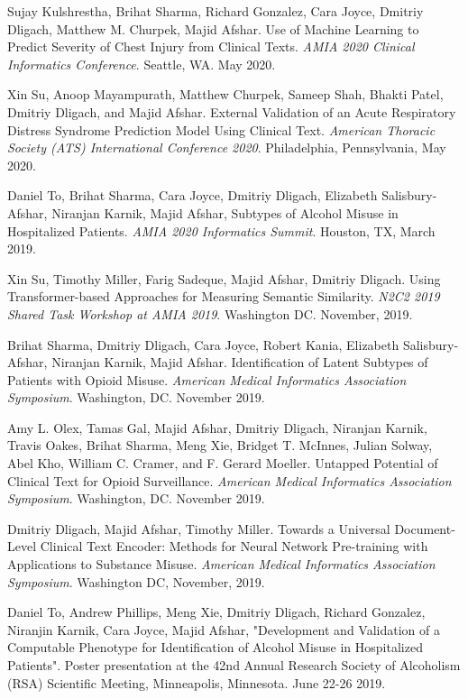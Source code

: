 \documentclass[letterpaper]{article}
\renewenvironment{itemize}{
  \begin{list}{}{
    \setlength{\leftmargin}{1.5em}
  }
}{
  \end{list}
}
\begin{document}
\begin{itemize}
\item Sujay Kulshrestha, Brihat Sharma, Richard Gonzalez, Cara Joyce, Dmitriy Dligach, Matthew M. Churpek, Majid Afshar. Use of Machine Learning to Predict Severity of Chest Injury from Clinical Texts. \emph{AMIA 2020 Clinical Informatics Conference}. Seattle, WA. May 2020.
\item Xin Su, Anoop Mayampurath, Matthew Churpek, Sameep Shah, Bhakti Patel, Dmitriy Dligach, and Majid Afshar. External Validation of an Acute Respiratory Distress Syndrome Prediction Model Using Clinical Text. \emph{American Thoracic Society (ATS) International Conference 2020}. Philadelphia, Pennsylvania, May 2020.
\item Daniel To, Brihat Sharma, Cara Joyce, Dmitriy Dligach, Elizabeth Salisbury-Afshar, Niranjan Karnik, Majid Afshar, Subtypes of Alcohol Misuse in Hospitalized Patients. \emph{AMIA 2020 Informatics Summit}. Houston, TX, March 2019.
\item Xin Su, Timothy Miller, Farig Sadeque, Majid Afshar, Dmitriy Dligach. Using Transformer-based Approaches for Measuring Semantic Similarity. \emph{N2C2 2019 Shared Task Workshop at AMIA 2019}. Washington DC. November, 2019.
\item Brihat Sharma, Dmitriy Dligach, Cara Joyce, Robert Kania, Elizabeth Salisbury-Afshar, Niranjan Karnik, Majid Afshar. Identification of Latent Subtypes of Patients with Opioid Misuse. \emph{American Medical Informatics Association Symposium}. Washington, DC. November 2019.
\item Amy L. Olex, Tamas Gal, Majid Afshar, Dmitriy Dligach, Niranjan Karnik, Travis Oakes, Brihat Sharma, Meng Xie, Bridget T. McInnes, Julian Solway, Abel Kho, William C. Cramer, and F. Gerard Moeller. Untapped Potential of Clinical Text for Opioid Surveillance. \emph{American Medical Informatics Association Symposium}. Washington, DC. November 2019.
\item Dmitriy Dligach, Majid Afshar, Timothy Miller. Towards a Universal Document-Level Clinical Text Encoder: Methods for Neural Network Pre-training with Applications to Substance Misuse. \emph{American Medical Informatics Association Symposium}. Washington DC, November, 2019.
\item Daniel To, Andrew Phillips, Meng Xie, Dmitriy Dligach, Richard Gonzalez, Niranjin Karnik, Cara Joyce, Majid Afshar, "Development and Validation of a Computable Phenotype for Identification of Alcohol Misuse in Hospitalized Patients". Poster presentation at the 42nd Annual Research Society of Alcoholism (RSA) Scientific Meeting, Minneapolis, Minnesota. June 22-26 2019.

\end{itemize}
\end{document}
